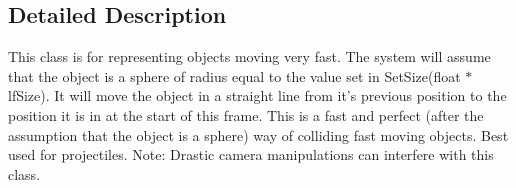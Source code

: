 \subsection{Detailed Description}
This class is for representing objects moving very fast. The system will assume that the object is a sphere of radius equal to the value set in SetSize(float $\ast$lfSize). It will move the object in a straight line from it's previous position to the position it is in at the start of this frame. This is a fast and perfect (after the assumption that the object is a sphere) way of colliding fast moving objects. Best used for projectiles. Note: Drastic camera manipulations can interfere with this class. 